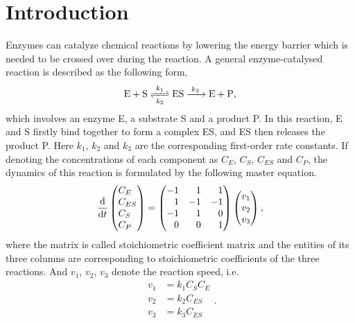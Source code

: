 \section{Introduction}
	Enzymes can catalyze chemical reactions by lowering the energy barrier which is needed to be crossed over during the reaction. A general enzyme-catalysed reaction is described as the following form,
	\begin{equation}
	\ce{E + S <=>[$k_1$][$k_2$] ES ->[$k_3$] E + P},
	\label{eq:chemical}
	\end{equation}
	which involves an enzyme E, a substrate S and a product P. In this reaction, E and S firstly bind together to form a complex ES, and ES then releases the product P. Here $k_1$, $k_2$ and $k_3$ are the corresponding first-order rate constants. If denoting the concentrations of each component as $C_E$, $C_S$, $C_{ES}$ and $C_P$, the dynamics of this reaction is formulated by the following master equation.
	\begin{equation}
	\dv{}{t}\begin{pmatrix*}[l] C_E \\ C_{ES} \\ C_S \\ C_P \end{pmatrix*} = 
		\begin{pmatrix*}[r]
			-1 &  1 &  1 \\
			 1 & -1 & -1 \\
			-1 &  1 &  0 \\
			 0 &  0 &  1 
		\end{pmatrix*}
		\begin{pmatrix} v_1 \\ v_2 \\ v_3\end{pmatrix},
	\label{eq: original_equation}
	\end{equation} 
	where the matrix is called stoichiometric coefficient matrix and the entities of its three columns are corresponding to stoichiometric coefficients of the three reactions. And $v_1$, $v_2$, $v_3$ denote the reaction speed, i.e.
	\begin{equation}
		\begin{aligned}
			v_1 &= k_1 C_S C_E \\
			v_2 &= k_2 C_{ES} \\
			v_3 &= k_3 C_{ES} \\
		\end{aligned}.
	\end{equation}

